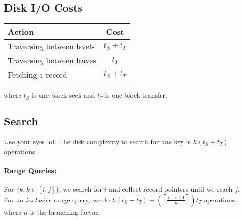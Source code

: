 \documentclass{report}
\renewcommand{\it}[1]{\textit{{#1}}}
\begin{document}
\subsection{Disk I/O Costs}
{
    \centering
    \begin{tabular}{l|c}
        Action & Cost \\
        \hline
        Traversing between levels & $t_S + t_T$ \\
        Traversing between leaves & $t_T$ \\
        Fetching a record & $t_S + t_T$
    \end{tabular}
    \par
}
where $t_S$ is one block seek and $t_T$ is one block transfer.

\subsection{Search}
Use your eyes lol. The disk complexity to search for \it{one} key is
$h(t_S + t_T)$ operations.

\paragraph{Range Queries:} For $\{ k : k \in [i, j]\}$, we search for $i$ and
collect record pointers until we reach $j$. For an \it{inclusive} range query,
we do $h\left(t_S + t_T\right) + \left(\left\lceil\frac{j - i + 1}{n}\right\rceil\right)t_T$ operations, where
$n$ is the branching factor.
\end{document}
